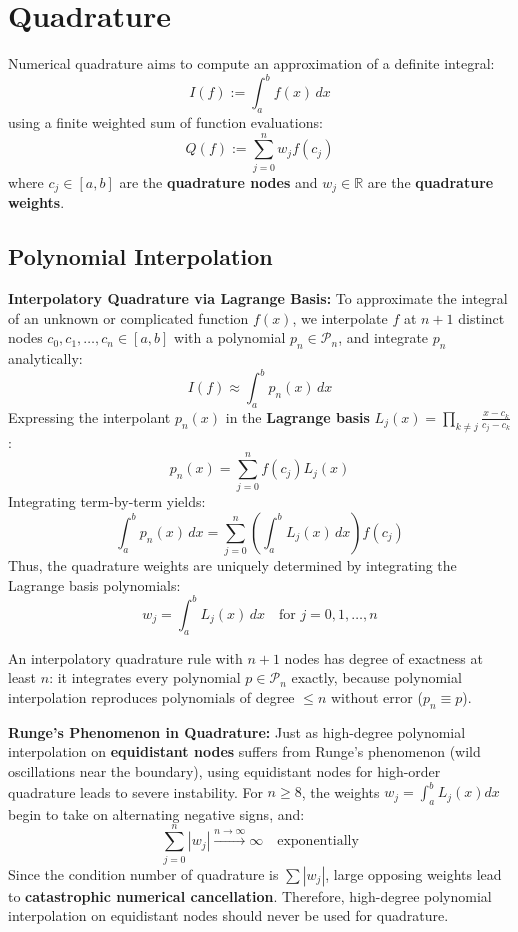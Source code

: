 \section{Quadrature}

Numerical quadrature aims to compute an approximation of a definite integral:
$$I(f) := \int_a^b f(x) \, dx$$
using a finite weighted sum of function evaluations:
$$Q(f) := \sum_{j=0}^n w_j f(c_j)$$
where $c_j \in [a, b]$ are the \textbf{quadrature nodes} and $w_j \in \mathbb{R}$ are the \textbf{quadrature weights}.

\subsection{Polynomial Interpolation}

\begin{definition}
    \textbf{Interpolatory Quadrature via Lagrange Basis:} To approximate the integral of an unknown or complicated function $f(x)$, we interpolate $f$ at $n+1$ distinct nodes $c_0, c_1, \dots, c_n \in [a,b]$ with a polynomial $p_n \in \mathcal{P}_n$, and integrate $p_n$ analytically:
    $$I(f) \approx \int_a^b p_n(x) \, dx$$
    Expressing the interpolant $p_n(x)$ in the \textbf{Lagrange basis} $L_j(x) = \prod_{k \neq j} \frac{x - c_k}{c_j - c_k}$:
    $$p_n(x) = \sum_{j=0}^n f(c_j) L_j(x)$$
    Integrating term-by-term yields:
    $$\int_a^b p_n(x) \, dx = \sum_{j=0}^n \left( \int_a^b L_j(x) \, dx \right) f(c_j)$$
    Thus, the quadrature weights are uniquely determined by integrating the Lagrange basis polynomials:
    $$w_j = \int_a^b L_j(x) \, dx \quad \text{for } j = 0, 1, \dots, n$$
\end{definition}

\begin{remark}
    An interpolatory quadrature rule with $n+1$ nodes has degree of exactness at least $n$: it integrates every polynomial $p \in \mathcal{P}_n$ exactly, because polynomial interpolation reproduces polynomials of degree $\le n$ without error ($p_n \equiv p$).
\end{remark}

\begin{important}
    \textbf{Runge's Phenomenon in Quadrature:} Just as high-degree polynomial interpolation on \textbf{equidistant nodes} suffers from Runge's phenomenon (wild oscillations near the boundary), using equidistant nodes for high-order quadrature leads to severe instability.
    For $n \ge 8$, the weights $w_j = \int_a^b L_j(x) dx$ begin to take on alternating negative signs, and:
    $$\sum_{j=0}^n |w_j| \xrightarrow{n \to \infty} \infty \quad \text{exponentially}$$
    Since the condition number of quadrature is $\sum |w_j|$, large opposing weights lead to \textbf{catastrophic numerical cancellation}. Therefore, high-degree polynomial interpolation on equidistant nodes should never be used for quadrature.
\end{important}

